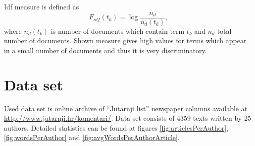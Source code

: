 \documentclass[11pt,english]{article}
\begin{document}
\begin{multicols}{2}
Idf measure is defined as
\begin{equation}
F_{idf}(t_k) = \log \frac{n_d}{n_d(t_k)},
\label{equ:idf}
\end{equation}
where $n_d(t_k)$ is number of documents which contain term $t_k$ and $n_d$
total number of documents. Shown measure gives high values for terms which
appear in a small number of documents and thus it is very discriminatory.


\section{Data set}
\label{sec:podatci}
Used data set is online archive of ``Jutarnji list'' newspaper columns
available at \url{http://www.jutarnji.hr/komentari/}. Data set consists of
4359 texts written by 25 authors. Detailed statistics can be found at figures
\ref{fig:articlesPerAuthor}, \ref{fig:wordsPerAuthor} and
\ref{fig:avgWordsPerAuthorArticle}.



\end{multicols}
\end{document}
